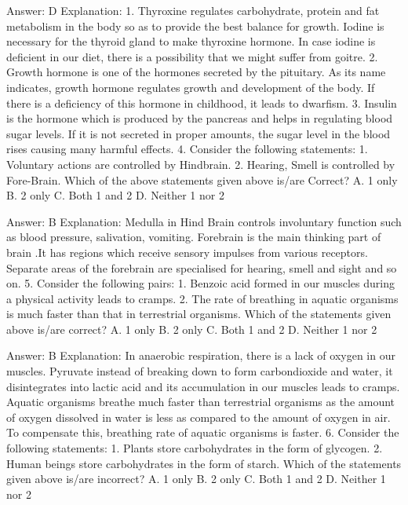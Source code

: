 Answer: D
Explanation: 1. Thyroxine regulates carbohydrate, protein and fat metabolism in the body so as to provide the best balance for growth. Iodine is necessary for the thyroid gland to make thyroxine hormone. In case iodine is deficient in our diet, there is a possibility that we might suffer from goitre. 2. Growth hormone is one of the hormones secreted by the pituitary. As its name indicates, growth hormone regulates growth and development of the body. If there is a deficiency of this hormone in childhood, it leads to dwarfism. 3. Insulin is the hormone which is produced by the pancreas and helps in regulating blood sugar levels. If it is not secreted in proper amounts, the sugar level in the blood rises causing many harmful effects. 4. Consider the following statements: 1. Voluntary actions are controlled by Hindbrain. 2. Hearing, Smell is controlled by Fore-Brain. Which of the above statements given above is/are Correct? A. 1 only B. 2 only C. Both 1 and 2 D. Neither 1 nor 2 

Answer: B
Explanation: Medulla in Hind Brain controls involuntary function such as blood pressure, salivation, vomiting. Forebrain is the main thinking part of brain .It has regions which receive sensory impulses from various receptors. Separate areas of the forebrain are specialised for hearing, smell and sight and so on. 5. Consider the following pairs: 1. Benzoic acid formed in our muscles during a physical activity leads to cramps. 2. The rate of breathing in aquatic organisms is much faster than that in terrestrial organisms. Which of the statements given above is/are correct? A. 1 only B. 2 only C. Both 1 and 2 D. Neither 1 nor 2 

Answer: B
Explanation: In anaerobic respiration, there is a lack of oxygen in our muscles. Pyruvate instead of breaking down to form carbondioxide and water, it disintegrates into lactic acid and its accumulation in our muscles leads to cramps. Aquatic organisms breathe much faster than terrestrial organisms as the amount of oxygen dissolved in water is less as compared to the amount of oxygen in air. To compensate this, breathing rate of aquatic organisms is faster. 6. Consider the following statements: 1. Plants store carbohydrates in the form of glycogen. 2. Human beings store carbohydrates in the form of starch. Which of the statements given above is/are incorrect? A. 1 only B. 2 only C. Both 1 and 2 D. Neither 1 nor 2 

